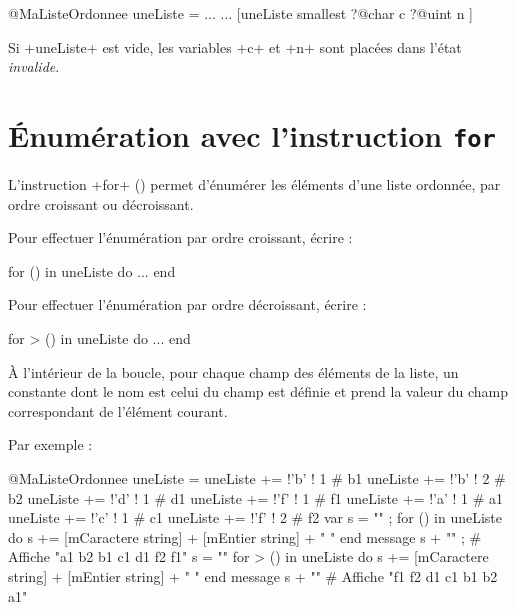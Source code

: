 \begin{galgas}
@MaListeOrdonnee uneListe = ...
...
[uneListe smallest
  ?@char c
  ?@uint n
]
\end{galgas}

Si \ggs+uneListe+ est vide, les variables \ggs+c+ et \ggs+n+ sont placées dans l'état \emph{invalide}.




\section{Énumération avec l'instruction \texttt{for}}

L'instruction \ggs+for+ () permet d'énumérer les éléments d'une liste ordonnée, par ordre croissant ou décroissant.

Pour effectuer l'énumération par ordre croissant, écrire :
\begin{galgas}
for () in uneListe do
  ...
end
\end{galgas}

Pour effectuer l'énumération par ordre décroissant, écrire :
\begin{galgas}
for > () in uneListe do
  ...
end
\end{galgas}

À l'intérieur de la boucle, pour chaque champ des éléments de la liste, un constante dont le nom est celui du champ est définie et prend la valeur du champ correspondant de l'élément courant.

Par exemple :

\begin{galgas}
@MaListeOrdonnee uneListe = {}
uneListe += !'b' ! 1 # b1
uneListe += !'b' ! 2 # b2
uneListe += !'d' ! 1 # d1
uneListe += !'f' ! 1 # f1
uneListe += !'a' ! 1 # a1
uneListe += !'c' ! 1 # c1
uneListe += !'f' ! 2 # f2
var s = "" ;
for () in uneListe do
  s += [mCaractere string] + [mEntier string] + " "
end
message s + "\n" ; # Affiche "a1 b2 b1 c1 d1 f2 f1"
s = ""
for > () in uneListe do
  s += [mCaractere string] + [mEntier string] + " "
end
message s + "\n" # Affiche "f1 f2 d1 c1 b1 b2 a1"
\end{galgas}
